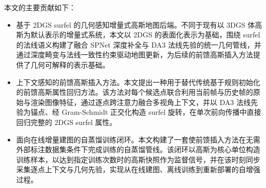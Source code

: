 本文的主要贡献如下：

\begin{itemize}
    \item 基于 2DGS surfel 的几何感知增量式高斯地图后端。不同于现有以 3DGS 体高斯为默认表示的增量式系统，本文以 2DGS 的表面化表示为基础，围绕 surfel 的法线语义构建了融合 SPNet 深度补全与 DA3 法线先验的统一几何管线，并通过深度畸变与法线一致性约束驱动地图更新，为后续的前馈高斯插入方法提供了几何可解释的表示基础。

    \item 上下文感知的前馈高斯插入方法。本文提出一种用于替代传统基于规则初始化的前馈高斯属性回归方法。该方法对每个候选点联合利用当前帧与历史帧的原始与渲染图像特征，通过逐点跨注意力融合多视角上下文，并以 DA3 法线先验为锚点、经 Gram-Schmidt 正交化构造 surfel 旋转，在单次前向传播中直接回归完整的 2DGS surfel 属性。

    \item 面向在线增量建图的自蒸馏训练闭环。本文构建了一套使前馈插入方法在无需外部标注数据集条件下完成训练的自蒸馏管线。该闭环以高斯为核心单位构造训练样本，以达到指定训练次数时的高斯快照作为监督信号，并在该时刻同步采集逐点上下文与几何先验，实现从在线建图、离线训练到重新部署的自增强过程。
\end{itemize}
